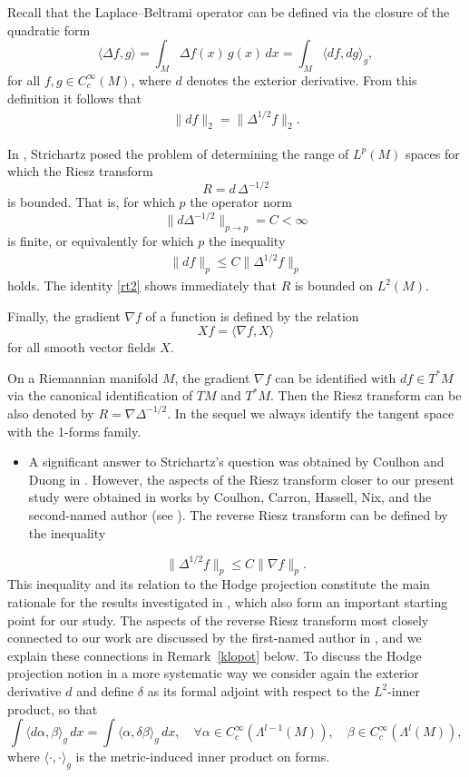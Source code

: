 \documentclass[12pt]{amsart}
\begin{document}
Recall that the Laplace--Beltrami operator can be defined via the closure of the quadratic form
\[
\langle \Delta f, g \rangle 
= \int_M \Delta f(x)\, g(x)\, dx 
= \int_M \langle df, dg \rangle_g,
\]
for all \(f,g \in C_c^\infty(M)\), where \(d\) denotes the exterior derivative. From this 
definition it follows that
\begin{align}\label{rt2}
  \|df\|_{2} = \|\Delta^{1/2} f\|_{2}.
\end{align}

In \cite{Str}, Strichartz posed the problem of determining the range of \(L^p(M)\) spaces 
for which the Riesz transform
\[
R = d\, \Delta^{-1/2}
\]
is bounded. That is, for which \(p\) the operator norm
\[
\|d \Delta^{-1/2}\|_{p \to p} = C < \infty
\]
is finite, or equivalently for which \(p\) the inequality
\begin{align}\label{rt}
  \|df\|_{p} \leq C \|\Delta^{1/2} f\|_{p}
\end{align}
holds. The identity \eqref{rt2} shows immediately that \(R\) is bounded on \(L^2(M)\).

Finally, the gradient \(\nabla f\) of a function is defined by the relation
\[
Xf = \langle \nabla f, X \rangle
\]
for all smooth vector fields \(X\).


 On a Riemannian manifold \( M \), the gradient \( \nabla f \) can be identified with \( df \in T^*M \) via the canonical identification of \( TM \) and \( T^*M \). Then the Riesz transform can be also denoted by $ R = \nabla  \Delta^{-1/2} $. In the sequel we always identify the tangent space with the 1-forms family. 

\begin{itemize}
    \item A significant answer to Strichartz’s question was obtained by Coulhon and Duong in \cite{CoDu}. However, the aspects of the Riesz transform closer to our present study were obtained in works by Coulhon, Carron, Hassell, Nix, and the second-named author (see \cite{CCH, HNS, HS}). The reverse Riesz transform can be defined by the inequality
\end{itemize}
\begin{equation}\label{rrt}
    \|\Delta^{1/2} f\|_p \le C \|\nabla f\|_p.
\end{equation}
This inequality and its relation to the Hodge projection constitute the main rationale for the results investigated in \cite{AC}, which also form an important starting point for our study. The aspects of the reverse Riesz transform most closely connected to our work are discussed by the first-named author in \cite{He2}, and we explain these connections in Remark~\ref{klopot} below.
To discuss the Hodge projection notion in a more systematic way we consider again  the exterior derivative  \(d\)  and define \(\delta\) as its formal adjoint with respect to the \(L^2\)-inner product, so that 
\[
\int \langle d\alpha, \beta \rangle_g \, dx = \int \langle \alpha, \delta \beta \rangle_g \, dx,\quad \forall \alpha \in C_c^\infty(\Lambda^{l-1}(M)),\quad \beta \in C_c^\infty(\Lambda^l(M)),
\]
where $\langle \cdot, \cdot \rangle_g$ is the metric-induced inner product on forms. 
\end{document}
